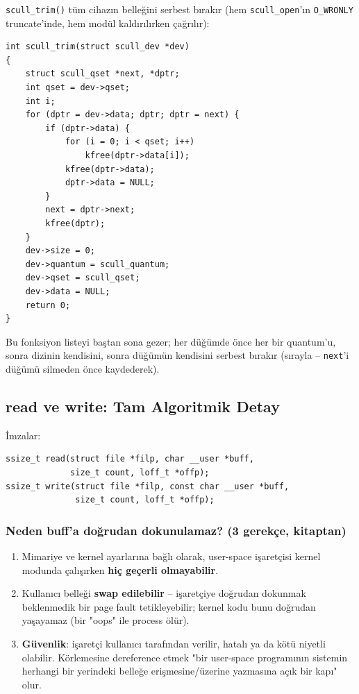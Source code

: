 \documentclass[11pt,a4paper]{article}
\begin{document}
\texttt{scull\_trim()} tüm cihazın belleğini serbest bırakır (hem
\texttt{scull\_open}'ın \texttt{O\_WRONLY} truncate'inde, hem modül
kaldırılırken çağrılır):

\begin{lstlisting}
int scull_trim(struct scull_dev *dev)
{
    struct scull_qset *next, *dptr;
    int qset = dev->qset;
    int i;
    for (dptr = dev->data; dptr; dptr = next) {
        if (dptr->data) {
            for (i = 0; i < qset; i++)
                kfree(dptr->data[i]);
            kfree(dptr->data);
            dptr->data = NULL;
        }
        next = dptr->next;
        kfree(dptr);
    }
    dev->size = 0;
    dev->quantum = scull_quantum;
    dev->qset = scull_qset;
    dev->data = NULL;
    return 0;
}
\end{lstlisting}

Bu fonksiyon listeyi baştan sona gezer; her düğümde önce her bir
quantum'u, sonra dizinin kendisini, sonra düğümün kendisini serbest
bırakır (sırayla -- \texttt{next}'i düğümü silmeden önce kaydederek).

\subsection{read ve write: Tam Algoritmik Detay}

İmzalar:
\begin{lstlisting}
ssize_t read(struct file *filp, char __user *buff,
             size_t count, loff_t *offp);
ssize_t write(struct file *filp, const char __user *buff,
              size_t count, loff_t *offp);
\end{lstlisting}

\subsubsection{Neden buff'a doğrudan dokunulamaz? (3 gerekçe, kitaptan)}
\begin{enumerate}[leftmargin=1.2cm]
  \item Mimariye ve kernel ayarlarına bağlı olarak, user-space
  işaretçisi kernel modunda çalışırken \textbf{hiç geçerli
  olmayabilir}.
  \item Kullanıcı belleği \textbf{swap edilebilir} -- işaretçiye
  doğrudan dokunmak beklenmedik bir page fault tetikleyebilir; kernel
  kodu bunu doğrudan yaşayamaz (bir "oops" ile process ölür).
  \item \textbf{Güvenlik}: işaretçi kullanıcı tarafından verilir,
  hatalı ya da kötü niyetli olabilir. Körlemesine dereference etmek
  "bir user-space programının sistemin herhangi bir yerindeki belleğe
  erişmesine/üzerine yazmasına açık bir kapı" olur.
\end{enumerate}
\end{document}
